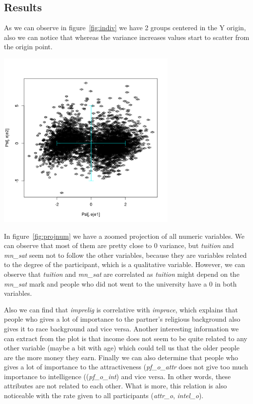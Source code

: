 \subsection{Results}
As we can observe in figure~\ref{fig:indiv} we have 2 groups centered in the Y origin, also we can notice that whereas the variance increases values start to scatter from the origin point.
\begin{center}
\includegraphics[width=3.5in]{images/ACP/individuals.png}
\label{fig:indiv}
\end{center}

In figure~\ref{fig:projnum} we have a zoomed projection of all numeric variables. We can observe that most of them are pretty close to 0 variance, but \textit{tuition} and \textit{mn\_sat} seem not to follow the other variables, because they are variables related to the degree of the participant, which is a qualitative variable. However, we can observe that \textit{tuition} and \textit{mn\_sat} are correlated as \textit{tuition} might depend on the \textit{mn\_sat} mark and people who did not went to the university have a 0 in both variables.

Also we can find that \textit{imprelig} is correlative with \textit{imprace}, which explains that people who gives a lot of importance to the partner's religious background also gives it to race background and vice versa. Another interesting information we can extract from the plot is that income does not seem to be quite related to any other variable (maybe a bit with age) which could tell us that the older people are the more money they earn. Finally we can also determine that people who gives a lot of importance to the attractiveness (\textit{pf\_o\_attr} does not give too much importance to intelligence ((\textit{pf\_o\_int}) and vice versa. In other words, these attributes are not related to each other. What is more, this relation is also noticeable with the rate given to all participants (\textit{attr\_o}, \textit{intel\_o}).

